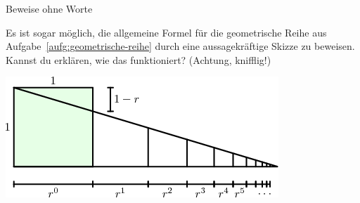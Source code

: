 \documentclass[twoside]{../zirkelblatt1415}
\theoremstyle{definition}
\theoremstyle{plain}
\theoremstyle{remark}
\begin{document}
\begin{aufgabe}{Beweise ohne Worte}
\begin{center}
\end{center}
Es ist sogar möglich, die allgemeine Formel für die geometrische Reihe aus
Aufgabe~\ref{aufg:geometrische-reihe} durch eine aussagekräftige Skizze zu
beweisen. Kannst du erklären, wie das funktioniert? (Achtung, knifflig!)
\begin{center}
  \includegraphics[scale=0.5]{geometrische-reihe-6}
\end{center}
\end{aufgabe}
\end{document}
